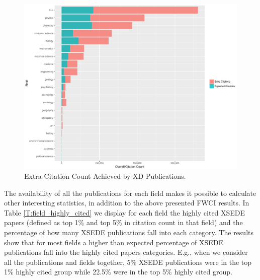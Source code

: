 \documentclass{sig-alternate}
\begin{document}
\begin{figure}[htb!]
    \includegraphics[width=0.95\columnwidth]{images/FWCI_CC.pdf}
    \caption{Extra Citation Count Achieved by XD Publications.}
    \label{F:FWCI_CC}
\end{figure}

The availability of all the publications for each field makes it possible to calculate other
interesting statistics, in addition to the above presented FWCI results. In Table \ref{T:field_highly_cited}
we display for each field the highly cited XSEDE papers (defined as top 1\% and top 5\% in citation count in
that field) and the percentage of how many XSEDE publications fall into each category. The results show that
for most fields a higher than expected percentage of XSEDE publications fall into the highly cited papers
categories. E.g., when we consider all the publications and fields together, 5\% XSEDE publications were
in the top 1\% highly cited group while 22.5\% were in the top 5\% highly cited group.
\end{document}
